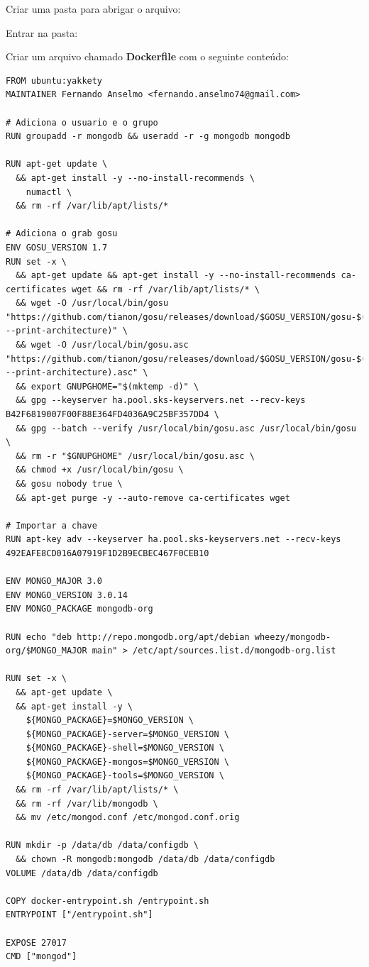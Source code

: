 \documentclass[a4paper,11pt]{article}
\begin{document}
Criar uma pasta para abrigar o arquivo: \\

Entrar na pasta: \\

Criar um arquivo chamado \textbf{Dockerfile} com o seguinte conteúdo:
\begin{lstlisting}
FROM ubuntu:yakkety
MAINTAINER Fernando Anselmo <fernando.anselmo74@gmail.com>

# Adiciona o usuario e o grupo
RUN groupadd -r mongodb && useradd -r -g mongodb mongodb

RUN apt-get update \
  && apt-get install -y --no-install-recommends \
    numactl \
  && rm -rf /var/lib/apt/lists/*

# Adiciona o grab gosu
ENV GOSU_VERSION 1.7
RUN set -x \
  && apt-get update && apt-get install -y --no-install-recommends ca-certificates wget && rm -rf /var/lib/apt/lists/* \
  && wget -O /usr/local/bin/gosu "https://github.com/tianon/gosu/releases/download/$GOSU_VERSION/gosu-$(dpkg --print-architecture)" \
  && wget -O /usr/local/bin/gosu.asc "https://github.com/tianon/gosu/releases/download/$GOSU_VERSION/gosu-$(dpkg --print-architecture).asc" \
  && export GNUPGHOME="$(mktemp -d)" \
  && gpg --keyserver ha.pool.sks-keyservers.net --recv-keys B42F6819007F00F88E364FD4036A9C25BF357DD4 \
  && gpg --batch --verify /usr/local/bin/gosu.asc /usr/local/bin/gosu \
  && rm -r "$GNUPGHOME" /usr/local/bin/gosu.asc \
  && chmod +x /usr/local/bin/gosu \
  && gosu nobody true \
  && apt-get purge -y --auto-remove ca-certificates wget

# Importar a chave
RUN apt-key adv --keyserver ha.pool.sks-keyservers.net --recv-keys 492EAFE8CD016A07919F1D2B9ECBEC467F0CEB10

ENV MONGO_MAJOR 3.0
ENV MONGO_VERSION 3.0.14
ENV MONGO_PACKAGE mongodb-org

RUN echo "deb http://repo.mongodb.org/apt/debian wheezy/mongodb-org/$MONGO_MAJOR main" > /etc/apt/sources.list.d/mongodb-org.list

RUN set -x \
  && apt-get update \
  && apt-get install -y \
    ${MONGO_PACKAGE}=$MONGO_VERSION \
    ${MONGO_PACKAGE}-server=$MONGO_VERSION \
    ${MONGO_PACKAGE}-shell=$MONGO_VERSION \
    ${MONGO_PACKAGE}-mongos=$MONGO_VERSION \
    ${MONGO_PACKAGE}-tools=$MONGO_VERSION \
  && rm -rf /var/lib/apt/lists/* \
  && rm -rf /var/lib/mongodb \
  && mv /etc/mongod.conf /etc/mongod.conf.orig

RUN mkdir -p /data/db /data/configdb \
  && chown -R mongodb:mongodb /data/db /data/configdb
VOLUME /data/db /data/configdb

COPY docker-entrypoint.sh /entrypoint.sh
ENTRYPOINT ["/entrypoint.sh"]

EXPOSE 27017
CMD ["mongod"]
\end{lstlisting}
\end{document}
